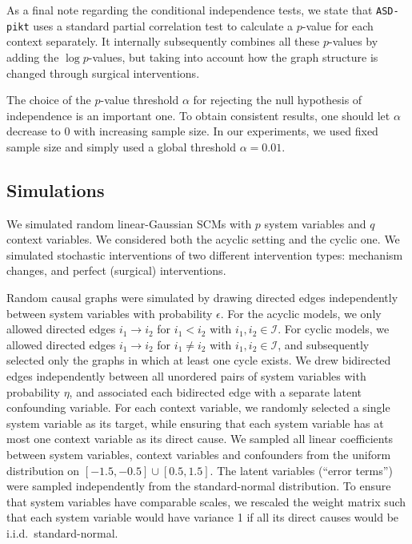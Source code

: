 \documentclass[twoside,11pt]{article}
\newcommand\C[1]{\mathcal{#1}}
\newcommand{\alg}[1]{\texttt{#1}}
\newcommand{\Joris}[1]{{\color{blue}#1}}
\begin{document}
As a final note regarding the conditional independence tests, we state that
\alg{ASD-pikt} uses a standard partial correlation test to calculate a
$p$-value for each context separately.  It internally subsequently combines all
these $p$-values by adding the $\log p$-values, but taking into account how the
graph structure is changed through surgical interventions.

The choice of the $p$-value threshold $\alpha$ for rejecting the null hypothesis
of independence is an important one. To obtain consistent results, one should let
$\alpha$ decrease to $0$ with increasing sample size. In our experiments, we used
fixed sample size and simply used a global threshold $\alpha = 0.01$.


\subsection{Simulations}\label{sec:simulations}

We simulated random linear-Gaussian SCMs with $p$ system variables and $q$
context variables. We considered both the acyclic setting and the cyclic one.
We simulated stochastic interventions of two different intervention types:
mechanism changes, and perfect (surgical) interventions.

Random causal graphs
were simulated by drawing directed edges independently between system variables
with probability $\epsilon$. For the acyclic models, we only allowed directed
edges $i_1\to i_2$ for $i_1<i_2$ with $i_1,i_2 \in \C{I}$. For cyclic models, we allowed
directed edges $i_1\to i_2$ for $i_1\ne i_2$ with $i_1,i_2 \in \C{I}$, and subsequently
selected only the graphs in which at least one cycle exists. We drew bidirected
edges independently between all unordered pairs of system variables with
probability $\eta$, and associated each bidirected edge with a separate latent
confounding variable. For each context variable, we randomly selected a single
system variable as its target, while ensuring that each system variable has at
most one context variable as its direct cause. We sampled all linear
coefficients between system variables, context variables and confounders from
the uniform distribution on $[-1.5,-0.5] \cup [0.5,1.5]$. The latent variables
(``error terms'') were sampled independently from the standard-normal
distribution. To ensure that system variables have comparable scales, we
rescaled the weight matrix such that each system variable would have variance 1
if all its direct causes would be i.i.d.\ standard-normal. 
\end{document}
